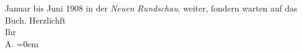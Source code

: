 \begin{ledgroupsized}[t]{13cm}
{{{                     Januar bis Juni 1908 in der \emph{Neuen Rundschau}.}}}\label{K_L01761-2h} weiter, ſondern warten auf das
               Buch.\pend
           \pstart
           Herzlichſt{\\[\baselineskip]}Ihr{\\[\baselineskip]}\spacefill\mbox{A.}\pend
           \leftskip=0em{}
         
         \endnumbering{}\end{ledgroupsized}  \newcommand{\dateiname}{L01761}\newcommand{\titel}{Arthur Schnitzler an Richard Beer-Hofmann, 18. 2. 1908}\newcommand{\editorInnen}{Martin Anton Müller und Gerd-Hermann Susen}
      